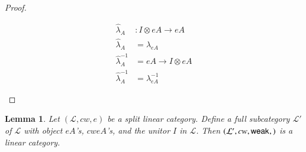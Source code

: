 \documentclass{article}
\newtheorem{lemma}[theorem]{Lemma}
\let\mto\to
\let\to\relax
\newcommand{\to}{\rightarrow}
\let\c\relax
\newcommand{\cat}[1]{\mathcal{#1}}
\newcommand{\w}[1]{\mathsf{weak}_{#1}}
\newcommand{\c}[1]{\mathsf{contra}_{#1}}
\begin{document}
\begin{proof}
\begin{enumerate}[label=\textbf{\emph{\alph*}})]
    \begin{align*}
      \hat\lambda_A &: I\otimes eA\mto eA          \\
      \hat\lambda_A &= \lambda_{eA}                \\
      \hat\lambda_A^{-1} &= eA\mto I\otimes eA     \\
      \hat\lambda_A^{-1} &= \lambda_{eA}^{-1}
    \end{align*}

  \end{enumerate}

\end{proof}


\iffalse
\begin{lemma}
  \label{lem:linear-full-sub}
  Let $(\cat{L},cw,e)$ be a split linear category. Define a full
  subcategory $\cat{L'}$ of $\cat{L}$ with object $eA$'s, $cweA$'s, and
  the unitor $I$ in $\cat{L}$. Then $(\cat{L'},cw,\w{},\c{})$ is a linear
  category.
\end{lemma}
\end{document}
